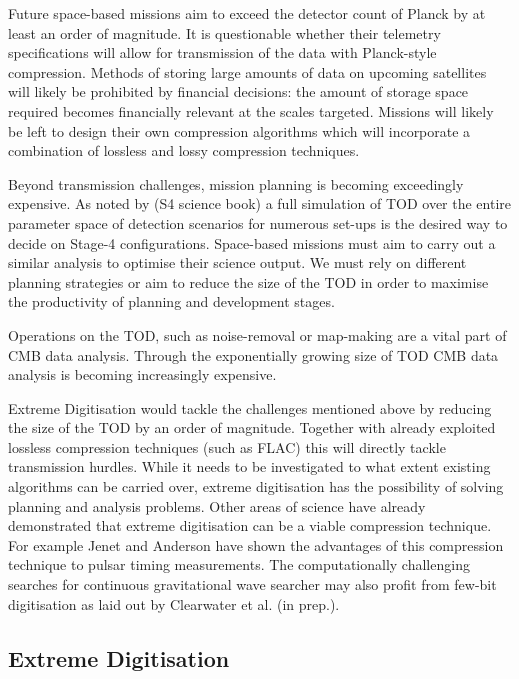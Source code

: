 \documentclass[apj]{emulateapj}
\begin{document}
Future space-based missions aim to exceed the detector count of Planck by at least an order of magnitude. It is questionable whether their telemetry specifications will allow for transmission of the data with Planck-style compression. Methods of storing large amounts of data on upcoming satellites will likely be prohibited by financial decisions: the amount of storage space required becomes financially relevant at the scales targeted. Missions will likely be left to design their own compression algorithms which will incorporate a combination of lossless and lossy compression techniques.


Beyond transmission challenges, mission planning is becoming exceedingly expensive. As noted by (S4 science book) a full simulation of TOD over the entire parameter space of detection scenarios for numerous set-ups is the desired way to decide on Stage-4 configurations. Space-based missions must aim to carry out a similar analysis to optimise their science output. We must rely on different planning strategies or aim to reduce the size of the TOD in order to maximise the productivity of planning and development stages.


Operations on the TOD, such as noise-removal or map-making are a vital part of CMB data analysis. Through the exponentially growing size of TOD CMB data analysis is becoming increasingly expensive. 


Extreme Digitisation would tackle the challenges mentioned above by reducing the size of the TOD by an order of magnitude. Together with already exploited lossless compression techniques (such as FLAC) this will directly tackle transmission hurdles. While it needs to be investigated to what extent existing algorithms can be carried over, extreme digitisation has the possibility of solving planning and analysis problems. Other areas of science have already demonstrated that extreme digitisation can be a viable compression technique. For example Jenet and Anderson have shown the advantages of this compression technique to pulsar timing measurements. The computationally challenging searches for continuous gravitational wave searcher may also profit from few-bit digitisation as laid out by Clearwater et al. (in prep.).

\subsection{Extreme Digitisation}
\label{subsec:extremedigitisation}
\end{document}
